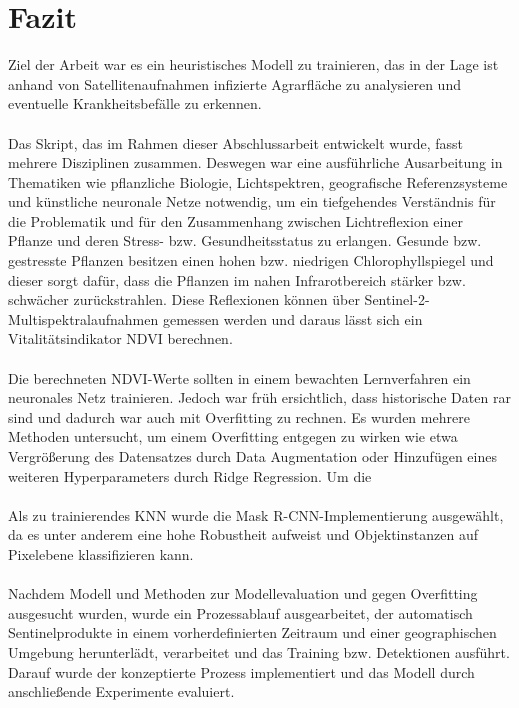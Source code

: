 \chapter{Fazit}\label{chap:summary}

Ziel der Arbeit war es ein heuristisches Modell zu trainieren, das in der Lage ist anhand von Satellitenaufnahmen infizierte Agrarfläche zu analysieren und eventuelle Krankheitsbefälle zu erkennen. 
\\\\
Das Skript, das im Rahmen dieser Abschlussarbeit entwickelt wurde, fasst mehrere Disziplinen zusammen. Deswegen war eine ausführliche Ausarbeitung in Thematiken wie pflanzliche Biologie, Lichtspektren, geografische Referenzsysteme und künstliche neuronale Netze notwendig, um ein tiefgehendes Verständnis für die Problematik und für den Zusammenhang zwischen Lichtreflexion einer Pflanze und deren Stress- bzw. Gesundheitsstatus zu erlangen. Gesunde bzw. gestresste Pflanzen besitzen einen hohen bzw. niedrigen Chlorophyllspiegel und dieser sorgt dafür, dass die Pflanzen im nahen Infrarotbereich stärker bzw. schwächer zurückstrahlen. Diese Reflexionen können über Sentinel-2-Multispektralaufnahmen gemessen werden und daraus lässt sich ein Vitalitätsindikator NDVI berechnen.
\\\\
Die berechneten NDVI-Werte sollten in einem bewachten Lernverfahren ein neuronales Netz trainieren. Jedoch war früh ersichtlich, dass historische Daten rar sind und dadurch war auch mit Overfitting zu rechnen. Es wurden mehrere Methoden untersucht, um einem Overfitting entgegen zu wirken wie etwa Vergrößerung des Datensatzes durch Data Augmentation oder Hinzufügen eines weiteren Hyperparameters durch Ridge Regression. Um die 
\\\\
Als zu trainierendes KNN wurde die Mask R-CNN-Implementierung ausgewählt, da es unter anderem eine hohe Robustheit aufweist und Objektinstanzen auf Pixelebene klassifizieren kann. 
\\\\
Nachdem Modell und Methoden zur Modellevaluation und gegen Overfitting ausgesucht wurden, wurde ein Prozessablauf ausgearbeitet, der automatisch Sentinelprodukte in einem vorherdefinierten Zeitraum und einer geographischen Umgebung herunterlädt, verarbeitet und das Training bzw. Detektionen ausführt. Darauf wurde der konzeptierte Prozess implementiert und das Modell durch anschließende Experimente evaluiert.
\\\\
